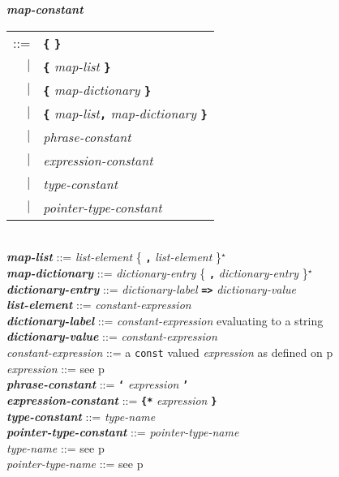 \documentclass[12pt]{article}
\newcommand{\TT}[1]{{\tt \bfseries #1}}
\newcommand{\STAR}{{\Large $^\star$}}
\newcommand{\emkey}[1]{{\em \bfseries #1}}
\newcommand{\pagref}[1]{p\pageref{#1}}
\newenvironment{indpar}[1][0.3in]%
	{\begin{list}{}%
		     {\setlength{\itemsep}{0in}%
		      \setlength{\topsep}{0in}%
		      \setlength{\parsep}{1ex}%
		      \setlength{\labelwidth}{#1}%
		      \setlength{\leftmargin}{#1}%
		      \addtolength{\leftmargin}{\labelsep}}%
	 \item}%
	{\end{list}}
\begin{document}
\begin{indpar}
\emkey{map-constant}\label{MAP-CONSTANT}
    \begin{tabular}[t]{rl}
    ::= & \TT{\{} \TT{\}} \\
    $|$ & \TT{\{} {\em map-list} \TT{\}} \\
    $|$ & \TT{\{} {\em map-dictionary} \TT{\}} \\
    $|$ & \TT{\{} {\em map-list}\TT{,} {\em map-dictionary} \TT{\}} \\
    $|$ & {\em phrase-constant} \\
    $|$ & {\em expression-constant} \\
    $|$ & {\em type-constant} \\
    $|$ & {\em pointer-type-constant} \\
    \end{tabular}
\\[0.5ex]
\emkey{map-list} ::= {\em list-element} \{ \TT{,} {\em list-element} \}\STAR{}
\\[0.5ex]
\emkey{map-dictionary} ::= {\em dictionary-entry}
                              \{ \TT{,} {\em dictionary-entry} \}\STAR{}
\\[0.5ex]
\emkey{dictionary-entry} ::=
    {\em dictionary-label} \TT{=>} {\em dictionary-value}
\\[0.5ex]
\emkey{list-element}\label{LIST-ELEMENT} ::= {\em constant-expression}
\\[0.5ex]
\emkey{dictionary-label}\label{DICTIONARY-LABEL}
    ::= {\em constant-expression} evaluating to a string
\\[0.5ex]
\emkey{dictionary-value}\label{DICTIONARY-VALUE}
    ::= {\em constant-expression}
\\[0.5ex]
{\em constant-expression} ::= a {\tt const} valued {\em expression} as
    defined on \pagref{CONSTANT-EXPRESSION}
\\[0.5ex]
{\em expression} ::= see \pagref{EXPRESSION}
\\[0.5ex]
\emkey{phrase-constant} ::= \TT{`} {\em expression} \TT{'}
\\[0.5ex]
\emkey{expression-constant} ::= \TT{\{*} {\em expression} \TT{*\}}
\\[0.5ex]
\emkey{type-constant} ::= {\em type-name}
\\[0.5ex]
\emkey{pointer-type-constant} ::= {\em pointer-type-name}
\\[0.5ex]
{\em type-name} ::= see \pagref{TYPE-NAME}
\\[0.5ex]
{\em pointer-type-name} ::= see \pagref{POINTER-TYPE-NAME}
\end{indpar}
\end{document}
